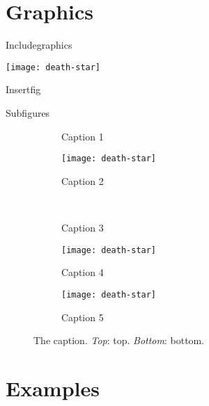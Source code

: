 \documentclass[xcolor=dvipsnames]{beamer}
\begin{document}
  \section{Graphics}

  \begin{frame}{Includegraphics}
    \begin{center}
      \texttt{[image: death-star]}
    \end{center}
  \end{frame}

  \begin{frame}{Insertfig}
  \end{frame}

  \begin{frame}{Subfigures}
    \begin{figure}[htb]
      \centering
      \begin{subfigure}[b]{.250\textwidth}
        \caption{Caption 1}  %
        \label{fig:1}
      \end{subfigure}
      \qquad
      \qquad
      \begin{subfigure}[b]{.250\textwidth}
        \texttt{[image: death-star]}
        \caption{Caption 2}
        \label{fig:2}
      \end{subfigure}
      \\
      \begin{subfigure}[b]{.175\textwidth}
        \caption{Caption 3}
        \label{fig:3}
      \end{subfigure}
      \qquad
      \begin{subfigure}[b]{.175\textwidth}
        \texttt{[image: death-star]}
        \caption{Caption 4}
        \label{fig:4}
      \end{subfigure}
      \qquad
      \begin{subfigure}[b]{.175\textwidth}
        \texttt{[image: death-star]}
        \caption{Caption 5}
        \label{fig:5}
      \end{subfigure}
      \caption{The caption. \emph{Top}: top. \emph{Bottom}: bottom.}
      \label{fig:subfigures}
    \end{figure}
  \end{frame}

  \section{Examples}
\end{document}
